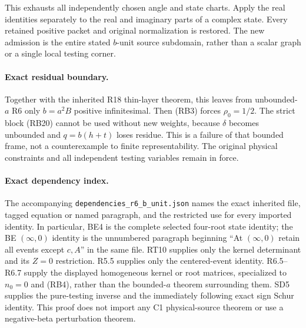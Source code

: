 This exhausts all independently chosen angle and state charts.
Apply the real identities separately to the real and imaginary parts
of a complex state. Every retained positive packet and original
normalization is restored. The new admission is the entire stated
$b$-unit source subdomain, rather than a scalar graph or a single
local testing corner.

\paragraph{Exact residual boundary.}
Together with the inherited R18 thin-layer theorem, this leaves from
unbounded-$a$ R6 only $b=a^2B$ positive infinitesimal. Then (RB3)
forces $\rho_0=1/2$. The strict block (RB20) cannot be used without
new weights, because $\delta$ becomes unbounded and $q=b(h+t)$
loses residue. This is a failure of that bounded frame, not a
counterexample to finite representability. The original physical
constraints and all independent testing variables remain in force.

\paragraph{Exact dependency index.}
The accompanying \texttt{dependencies\_r6\_b\_unit.json} names the
exact inherited file, tagged equation or named paragraph, and the
restricted use for every imported identity. In particular, BE4 is the
complete selected four-root state identity; the BE $(\infty,0)$ identity
is the unnumbered paragraph beginning ``At $(\infty,0)$ retain all
events except $c,A$'' in the same file. RT10 supplies only the
kernel determinant and its $Z=0$ restriction. R5.5 supplies only the
centered-event identity. R6.5--R6.7 supply the displayed homogeneous
kernel or root matrices, specialized to $n_0=0$ and (RB4), rather than
the bounded-$a$ theorem surrounding them. SD5 supplies the pure-testing
inverse and the immediately following exact sign Schur identity.
This proof does not import any C1 physical-source theorem or use a
negative-beta perturbation theorem.
